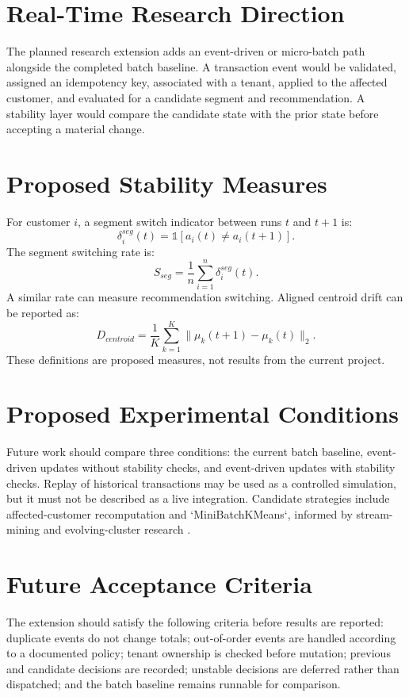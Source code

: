 \documentclass[12pt,a4paper]{report}
\begin{document}
\section{Real-Time Research Direction}
The planned research extension adds an event-driven or micro-batch path alongside the completed batch baseline. A transaction event would be validated, assigned an idempotency key, associated with a tenant, applied to the affected customer, and evaluated for a candidate segment and recommendation. A stability layer would compare the candidate state with the prior state before accepting a material change.

\section{Proposed Stability Measures}
For customer $i$, a segment switch indicator between runs $t$ and $t+1$ is:
\begin{equation}
\delta_i^{seg}(t)=\mathbb{1}[a_i(t)\ne a_i(t+1)].
\end{equation}
The segment switching rate is:
\begin{equation}
S_{seg}=\frac{1}{n}\sum_{i=1}^{n}\delta_i^{seg}(t).
\end{equation}
A similar rate can measure recommendation switching. Aligned centroid drift can be reported as:
\begin{equation}
D_{centroid}=\frac{1}{K}\sum_{k=1}^{K}\lVert\mu_k(t+1)-\mu_k(t)\rVert_2.
\end{equation}
These definitions are proposed measures, not results from the current project.

\section{Proposed Experimental Conditions}
Future work should compare three conditions: the current batch baseline, event-driven updates without stability checks, and event-driven updates with stability checks. Replay of historical transactions may be used as a controlled simulation, but it must not be described as a live integration. Candidate strategies include affected-customer recomputation and `MiniBatchKMeans`, informed by stream-mining and evolving-cluster research \cite{bifet2009,aggarwal2003,hubert1985}.

\section{Future Acceptance Criteria}
The extension should satisfy the following criteria before results are reported: duplicate events do not change totals; out-of-order events are handled according to a documented policy; tenant ownership is checked before mutation; previous and candidate decisions are recorded; unstable decisions are deferred rather than dispatched; and the batch baseline remains runnable for comparison.
\end{document}

